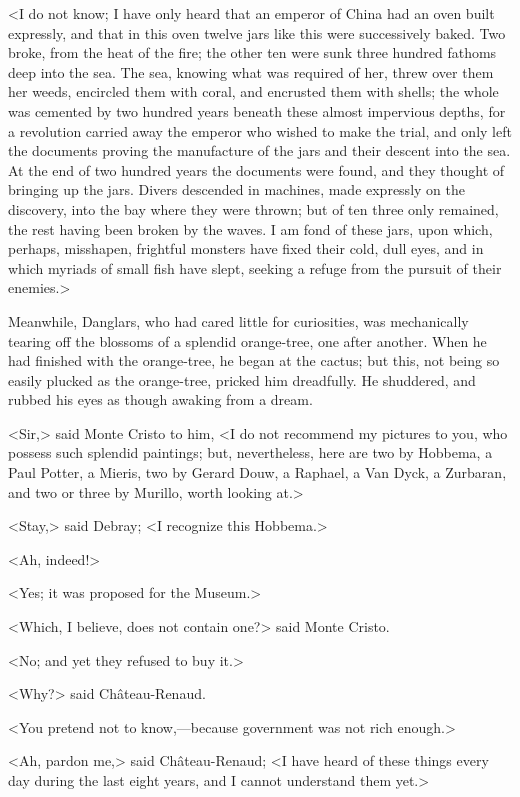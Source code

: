  <I do not know; I have only heard that an emperor of China had an oven built expressly, and that in this oven twelve jars like this were successively baked. Two broke, from the heat of the fire; the other ten were sunk three hundred fathoms deep into the sea. The sea, knowing what was required of her, threw over them her weeds, encircled them with coral, and encrusted them with shells; the whole was cemented by two hundred years beneath these almost impervious depths, for a revolution carried away the emperor who wished to make the trial, and only left the documents proving the manufacture of the jars and their descent into the sea. At the end of two hundred years the documents were found, and they thought of bringing up the jars. Divers descended in machines, made expressly on the discovery, into the bay where they were thrown; but of ten three only remained, the rest having been broken by the waves. I am fond of these jars, upon which, perhaps, misshapen, frightful monsters have fixed their cold, dull eyes, and in which myriads of small fish have slept, seeking a refuge from the pursuit of their enemies.> 

 Meanwhile, Danglars, who had cared little for curiosities, was mechanically tearing off the blossoms of a splendid orange-tree, one after another. When he had finished with the orange-tree, he began at the cactus; but this, not being so easily plucked as the orange-tree, pricked him dreadfully. He shuddered, and rubbed his eyes as though awaking from a dream. 

 <Sir,> said Monte Cristo to him, <I do not recommend my pictures to you, who possess such splendid paintings; but, nevertheless, here are two by Hobbema, a Paul Potter, a Mieris, two by Gerard Douw, a Raphael, a Van Dyck, a Zurbaran, and two or three by Murillo, worth looking at.> 

 <Stay,> said Debray; <I recognize this Hobbema.> 

 <Ah, indeed!> 

 <Yes; it was proposed for the Museum.> 

 <Which, I believe, does not contain one?> said Monte Cristo. 

 <No; and yet they refused to buy it.> 

 <Why?> said Château-Renaud. 

 <You pretend not to know,—because government was not rich enough.> 

 <Ah, pardon me,> said Château-Renaud; <I have heard of these things every day during the last eight years, and I cannot understand them yet.> 

